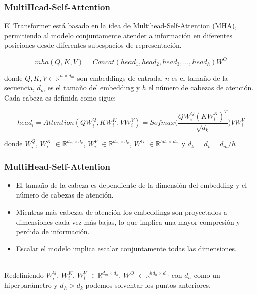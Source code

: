 \documentclass{beamer}
\newcommand\Fontvi{\fontsize{10}{12.2}\selectfont}
\newcommand\FontEq{\fontsize{8}{12.2}\selectfont}
\begin{document}
\begin{frame}
\frametitle{MultiHead-Self-Attention}

\Fontvi
El Transformer está basado en la idea de Multihead-Self-Attention (MHA), permitiendo al modelo
conjuntamente atender a información en diferentes posiciones desde diferentes subespacios de
representación.

\FontEq
\begin{equation}
    mha(Q, K, V) = Concat(head_1,head_2,head_3,..., head_h)W^O
\end{equation}

\Fontvi
donde $Q, K, V \in \mathbb{R}^{n \times d_{m}}$ son embeddings de entrada, $n$ es el tamaño de la
secuencia, $d_m$ es el tamaño del embedding y $h$ el número de cabezas de atención. Cada cabeza es
definida como sigue:

\FontEq
\begin{equation}
    head_i = Attention(QW_i^Q, KW_i^K, VW_i^V) =
    Sofmax\Big(\frac{QW_i^Q (KW_i^K)^T}{\sqrt{d_k}}\Big) VW_i^V
\end{equation}

\Fontvi
donde $W_i^Q$, $W_i^K$ $\in \mathbb{R}^{d_m \times d_k}$, $W_i^V$ $\in \mathbb{R}^{d_m \times d_v}$,
$W^O$ $\in \mathbb{R}^{hd_v \times d_m}$ y $d_k=d_v=d_m/h$

\end{frame}

\begin{frame}
\frametitle{MultiHead-Self-Attention}

\begin{itemize}
    \item El tamaño de la cabeza es dependiente de la dimensión del embedding y el número de cabezas
          de atención.
    \item Mientras más cabezas de atención los embeddings son proyectados a dimensiones cada vez
          más bajas, lo que implica una mayor compresión y perdida de información.
    \item Escalar el modelo implica escalar conjuntamente todas las dimensiones.\\~\
\end{itemize}

Redefiniendo  $W_i^Q$, $W_i^K$, $W_i^V$ $\in \mathbb{R}^{d_m \times d_h}$,
$W^O$ $\in \mathbb{R}^{hd_h \times d_m}$ con $d_h$ como un hiperparámetro y $d_h > d_k$
podemos solventar los puntos anteriores.

\end{frame}
\end{document}
